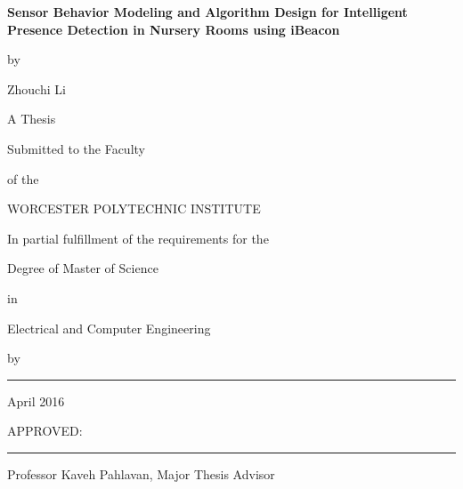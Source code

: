 \documentclass[12pt]{report}
\begin{document}
%


%
\newcommand{\brk}{\vspace*{0.18in}}

\thispagestyle{empty}

\begin{center}

\brk


   {\large 
	\textbf{
	Sensor Behavior Modeling and Algorithm Design for Intelligent Presence Detection in Nursery Rooms using iBeacon
	}
   }


\brk
by

\brk
Zhouchi Li


\brk\brk
A Thesis

\brk
Submitted to the Faculty

\brk
of the 

\brk
WORCESTER POLYTECHNIC INSTITUTE
	
\brk
In partial fulfillment of the requirements for the

\brk
Degree of Master of Science

\brk
in

\brk
Electrical and Computer Engineering

\brk
by

\brk\brk
\rule{3in}{1.2pt}

\brk
April 2016

\end{center}

	
\vfill
APPROVED:

\vspace{0.5in}
\rule{3in}{0.8pt}

Professor Kaveh Pahlavan, Major Thesis Advisor
\end{document}
